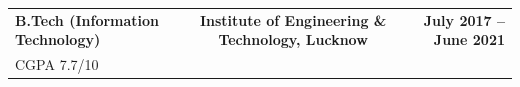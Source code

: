 \noindent
\begingroup
\renewcommand{\arraystretch}{1.05}
\fontsize{9.6}{11}\selectfont

\begin{tabularx}{\textwidth}{@{}L C R@{}}
    \textbf{B.Tech (Information Technology)} &
    \centering \textbf{Institute of Engineering \& Technology, Lucknow} &
    \textbf{July 2017 -- June 2021} \\
    CGPA 7.7/10 & &
\end{tabularx}
\endgroup
